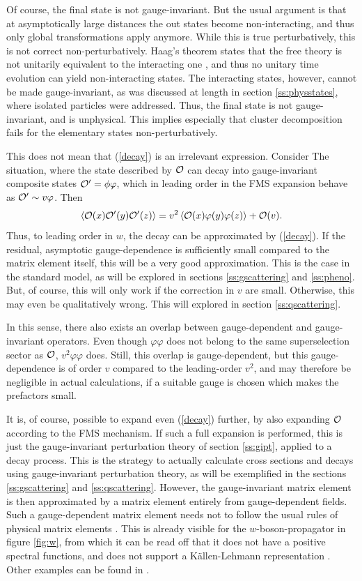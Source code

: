 \documentclass[final,twoside,12pt]{article}
\newcommand*{\no}{\noindent}
\newcommand*{\be}{\begin{equation}}
\newcommand*{\ee}{\end{equation}}
\newcommand*{\pref}[1]{(\ref{#1})}
\newcommand*{\nn}{\nonumber}
\newcommand*{\1}{1\!\!\!\bot}
\newcommand*{\la}{\left\langle}
\newcommand*{\ra}{\right\rangle}
\newcommand*{\op}{{\cal O}}
\begin{document}
Of course, the final state is not gauge-invariant. But the usual argument is that at asymptotically large distances the out states become non-interacting, and thus only global transformations apply anymore. While this is true perturbatively, this is not correct non-perturbatively. Haag's theorem states that the free theory is not unitarily equivalent to the interacting one \cite{Haag:1992hx}, and thus no unitary time evolution can yield non-interacting states. The interacting states, however, cannot be made gauge-invariant, as was discussed at length in section \ref{ss:physstates}, where isolated particles were addressed. Thus, the final state is not gauge-invariant, and is unphysical. This implies especially that cluster decomposition fails for the elementary states non-perturbatively.

This does not mean that \pref{decay} is an irrelevant expression. Consider The situation, where the state described by $\op$ can decay into gauge-invariant composite states $\op'=\phi\varphi$, which in leading order in the FMS expansion behave as $\op'\sim v\varphi$. Then
\be
\la\op(x)\op'(y)\op'(z)\ra=v^2\la\op(x)\varphi(y)\varphi(z)\ra+\op(v)\nn.
\ee
\no Thus, to leading order in $w$, the decay can be approximated by \pref{decay}. If the residual, asymptotic gauge-dependence is sufficiently small compared to the matrix element itself, this will be a very good approximation. This is the case in the standard model, as will be explored in sections \ref{ss:gscattering} and \ref{ss:pheno}. But, of course, this will only work if the correction in $v$ are small. Otherwise, this may even be qualitatively wrong. This will explored in section \ref{ss:qscattering}.

In this sense, there also exists an overlap between gauge-dependent and gauge-invariant operators. Even though $\varphi\varphi$ does not belong to the same superselection sector as $\op$, $v^2\varphi\varphi$ does. Still, this overlap is gauge-dependent, but this gauge-dependence is of order $v$ compared to the leading-order $v^2$, and may therefore be negligible in actual calculations, if a suitable gauge is chosen which makes the prefactors small.

It is, of course, possible to expand even \pref{decay} further, by also expanding $\op$ according to the FMS mechanism. If such a full expansion is performed, this is just the gauge-invariant perturbation theory of section \ref{ss:gipt}, applied to a decay process. This is the strategy to actually calculate cross sections and decays using gauge-invariant perturbation theory, as will be exemplified in the sections \ref{ss:gscattering} and \ref{ss:qscattering}. However, the gauge-invariant matrix element is then approximated by a matrix element entirely from gauge-dependent fields. Such a gauge-dependent matrix element needs not to follow the usual rules of physical matrix elements \cite{Seiler:1982pw}. This is already visible for the $w$-boson-propagator in figure \ref{fig:w}, from which it can be read off that it does not have a positive spectral functions, and does not support a K\"allen-Lehmann representation \cite{Maas:2011se}. Other examples can be found in \cite{Raubitzek:unpublished}.
\end{document}
